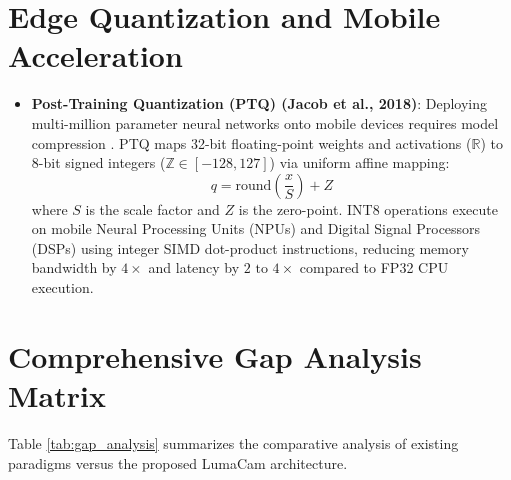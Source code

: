 \section{Edge Quantization and Mobile Acceleration}
\begin{itemize}
    \item \textbf{Post-Training Quantization (PTQ) (Jacob et al., 2018)}:
    Deploying multi-million parameter neural networks onto mobile devices requires model compression \cite{jacob2018quantization}. PTQ maps 32-bit floating-point weights and activations ($\mathbb{R}$) to 8-bit signed integers ($\mathbb{Z} \in [-128, 127]$) via uniform affine mapping:
    \begin{equation}
    q = \text{round}\left(\frac{x}{S}\right) + Z
    \label{eq:ptq_mapping}
    \end{equation}
    where $S$ is the scale factor and $Z$ is the zero-point. INT8 operations execute on mobile Neural Processing Units (NPUs) and Digital Signal Processors (DSPs) using integer SIMD dot-product instructions, reducing memory bandwidth by $4\times$ and latency by $2\text{ to }4\times$ compared to FP32 CPU execution.
\end{itemize}

\section{Comprehensive Gap Analysis Matrix}
Table \ref{tab:gap_analysis} summarizes the comparative analysis of existing paradigms versus the proposed LumaCam architecture.


